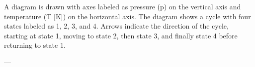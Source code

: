 A diagram is drawn with axes labeled as pressure (p) on the vertical axis and temperature (T [K]) on the horizontal axis. The diagram shows a cycle with four states labeled as 1, 2, 3, and 4. Arrows indicate the direction of the cycle, starting at state 1, moving to state 2, then state 3, and finally state 4 before returning to state 1.

---